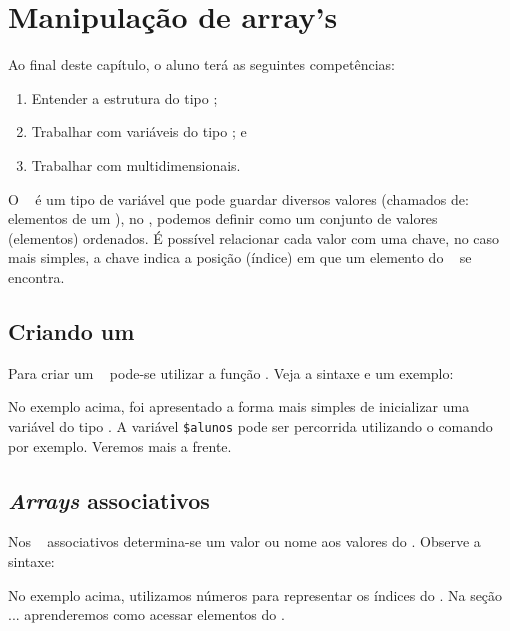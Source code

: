 \chapter{Manipulação de array's}
\label{manipulacao-de-arrays}

Ao final deste capítulo, o aluno terá as seguintes competências:
\begin{enumerate}
    \item Entender a estrutura do tipo \tipoarray;  
    \item Trabalhar com variáveis do tipo \tipoarray; e
    \item Trabalhar com \tipoarrays multidimensionais.
\end{enumerate}

O \tipoarray~ é um tipo de variável que pode guardar diversos valores (chamados de: elementos 
de um \tipoarray), no \php, podemos definir como um conjunto de valores (elementos) ordenados. 
É possível relacionar cada valor com uma chave, no caso mais simples, a chave indica a 
posição (índice) em que um elemento do \tipoarray~ se encontra.

\section{Criando um \comandoarray}
\label{criando-um-array}

Para criar um \tipoarray~ pode-se utilizar a função \comandoarray. Veja a sintaxe e um exemplo:



No exemplo acima, foi apresentado a forma mais simples de inicializar uma variável do 
tipo \tipoarray. A variável \texttt{\$alunos} pode ser percorrida utilizando o comando
\comandofor~ por exemplo. Veremos mais a frente.

\section{\textit{Arrays} associativos}
\label{arrays-associativos}

Nos \tipoarrays~ associativos determina-se um valor ou nome aos valores do \tipoarray.
Observe a sintaxe:



No exemplo acima, utilizamos números para representar os índices do \tipoarray. 
Na seção ... aprenderemos como acessar elementos do \tipoarray.

